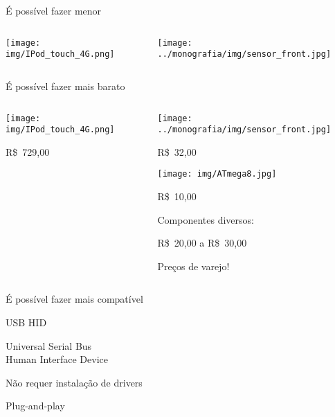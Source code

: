 \documentclass{beamer}
\begin{document}
\begin{frame}{É possível fazer menor}
	\begin{columns}
		\pause
		\begin{center}
			\texttt{[image: img/IPod\_touch\_4G.png]}

		\end{center}

		\pause
		\begin{center}
			\texttt{[image: ../monografia/img/sensor\_front.jpg]}

		\end{center}
	\end{columns}
\end{frame}


\begin{frame}{É possível fazer mais barato}
	\begin{columns}
		\pause
		\column{.5\textwidth}
		\begin{center}
			\texttt{[image: img/IPod\_touch\_4G.png]}

			R\$~729,00
		\end{center}

		\pause
		\column{.5\textwidth}
		\begin{center}
			\texttt{[image: ../monografia/img/sensor\_front.jpg]}

			R\$~32,00

			\pause
			\texttt{[image: img/ATmega8.jpg]}

			R\$~10,00

			\pause
			\medskip

			Componentes diversos:

			R\$~20,00 a R\$~30,00

			\pause
			\medskip

			Preços de varejo!
		\end{center}
	\end{columns}
\end{frame}


\begin{frame}{É possível fazer mais compatível}
	\begin{center}
		\pause

		{\LARGE USB HID}

		\medskip

		Universal Serial Bus \\
		Human Interface Device

		\pause
		\bigskip

		Não requer instalação de drivers

		\medskip

		Plug-and-play
	\end{center}
\end{frame}
\end{document}
